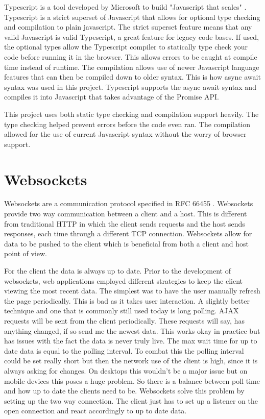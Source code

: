 Typescript is a tool developed by Microsoft to build "Javascript that scales" \cite{typescript}.
Typescript is a strict superset of Javascript that allows for optional type checking and compilation to plain javascript. The strict superset feature means that any valid Javascript is valid Typescript, a great feature for legacy code bases. If used, the optional types allow the Typescript compiler to statically type check your code before running it in the browser. This allows errors to be caught at compile time instead of runtime. The compilation allows use of newer Javascript language features that can then be compiled down to older syntax. This is how async await syntax was used in this project. Typescript supports the async await syntax and compiles it into Javascript that takes advantage of the Promise API. 


This project uses both static type checking and compilation support heavily. The type checking helped prevent errors before the code even ran. The compilation allowed for the use of current Javascript syntax without the worry of browser support. 


\section{Websockets}


Websockets are a communication protocol specified in RFC 66455 \cite{websocket-rfc}. Websockets provide two way communication between a client and a host. This is different from traditional HTTP in which the client sends requests and the host sends responses, each time through a different TCP connection. Websockets allow for data to be pushed to the client which is beneficial from both a client and host point of view.


For the client the data is always up to date. Prior to the development of websockets, web applications employed different strategies to keep the client viewing the most recent data. The simplest was to have the user manually refresh the page periodically. This is bad as it takes user interaction. A slightly better technique and one that is commonly still used today is long polling. AJAX requests will be sent from the client periodically. These requests will say, has anything changed, if so send me the newest data. This works okay in practice but has issues with the fact the data is never truly live. The max wait time for up to date data is equal to the polling interval. To combat this the polling interval could be set really short but then the network use of the client is high, since it is always asking for changes. On desktops this wouldn’t be a major issue but on mobile devices this poses a huge problem. So there is a balance between poll time and how up to date the clients need to be. Websockets solve this problem by setting up the two way connection. The client just has to set up a listener on the open connection and react accordingly to up to date data.


